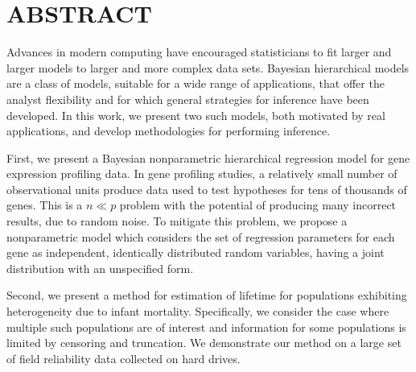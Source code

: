 \chapter*{ABSTRACT}
Advances in modern computing have encouraged statisticians to fit larger and larger models to larger and more complex data sets. Bayesian hierarchical models are a class of models, suitable for a wide range of applications, that offer the analyst flexibility and for which general strategies for inference have been developed. In this work, we present two such models, both motivated by real applications, and develop methodologies for performing inference.

First, we present a Bayesian nonparametric hierarchical regression model for gene expression profiling data. In gene profiling studies, a relatively small number of observational units produce data used to test hypotheses for tens of thousands of genes. This is a $n \ll p$ problem with the potential of producing many incorrect results, due to random noise. To mitigate this problem, we propose a nonparametric model which considers the set of regression parameters for each gene as independent, identically distributed random variables, having a joint distribution with an unspecified form.


Second, we present a method for estimation of lifetime for populations exhibiting heterogeneity due to infant mortality. Specifically, we consider the case where multiple such populations are of interest and information for some populations is limited by censoring and truncation. We demonstrate our method on a large set of field reliability data collected on hard drives.
